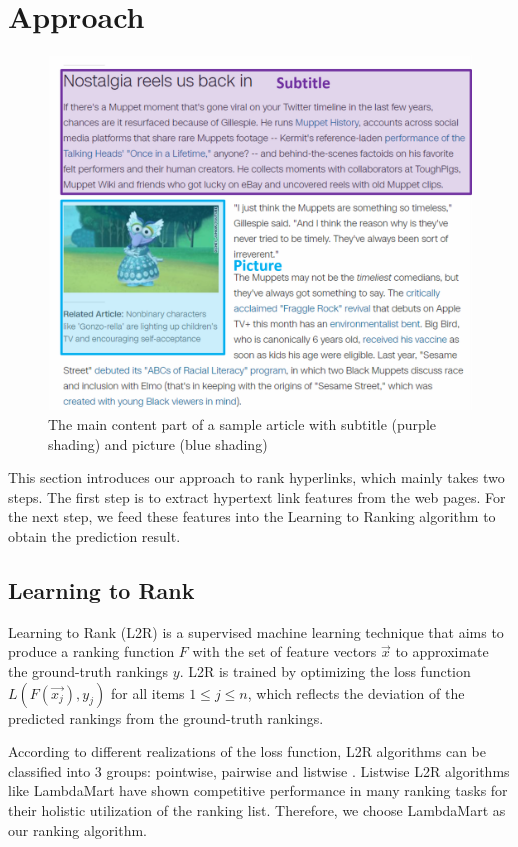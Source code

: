 \section{Approach} \label{sec_approach}

\begin{figure}[t]
\centering
\includegraphics[width=1\columnwidth]{vis_example2}
\caption{The main content part of a sample article with subtitle (purple shading) and picture (blue shading)}
\label{vis_example2}
\end{figure}

This section introduces our approach to rank hyperlinks, which mainly takes two steps. The first step is to extract hypertext link features from the web pages. For the next step, we feed these features into the Learning to Ranking algorithm to obtain the prediction result.

\subsection{Learning to Rank}

Learning to Rank (L2R) is a supervised machine learning technique that aims to produce a ranking function $F$ with the set of feature vectors $\vec{x}$ to approximate the ground-truth rankings $y$. L2R is trained by optimizing the loss function $L(F(\vec{x_j}), y_j)$ for all items $1 \leq j \leq n$, which reflects the deviation of the predicted rankings from the ground-truth rankings. 

According to different realizations of the loss function, L2R algorithms can be classified into 3 groups: pointwise, pairwise and listwise \cite{liu2011learning}. Listwise L2R algorithms like LambdaMart \cite{wu2010adapting} have shown competitive performance in many ranking tasks for their holistic utilization of the ranking list. Therefore, we choose LambdaMart as our ranking algorithm. 

